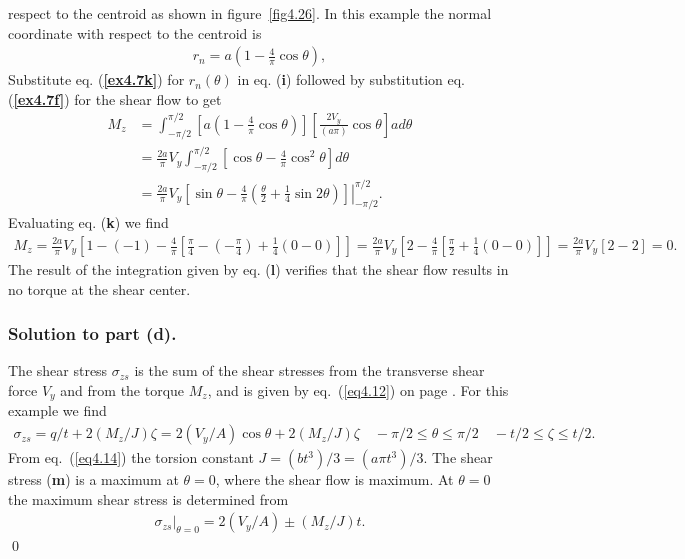 \documentclass{AeroStructure-ERJohnson}
\begin{document}
\begin{example*}
\noindent respect to the centroid as shown in figure~\ref{fig4.26}. In this example the normal coordinate with respect to the centroid is
\begin{align}\label{ex4.7j}
r_{n}=a\left(1-\frac{4}{\pi} \cos \theta\right),\end{align}
Substitute eq. (\textbf{\ref{ex4.7k}}) for $r_{n}(\theta)$ in eq. (\textbf{i}) followed by substitution eq. (\textbf{\ref{ex4.7f}}) for the shear flow to get
\begin{align}\label{ex4.7k}
M_{z}&=\int_{-\pi/2}^{\pi/2}\left[a\left(1-\frac{4}{\pi} \cos \theta\right)\right]\left[\frac{2 V_{y}}{(a \pi)} \cos \theta\right] a d \theta\nonumber\\[5pt]
&=\frac{2 a}{\pi} V_{y} \int_{-\pi/2}^{\pi/2}\left[\cos \theta-\frac{4}{\pi} \cos ^{2} \theta\right] d \theta
\nonumber\\[2pt]
&=\left.\frac{2 a}{\pi} V_{y}\left[\sin \theta-\frac{4}{\pi}\left(\frac{\theta}{2}+\frac{1}{4} \sin 2 \theta\right)\right]\right|_{-\pi/2} ^{\pi/2}.\end{align}
Evaluating eq. (\textbf{k}) we find
\begin{align}\label{ex4.7l}
M_{z} =\frac{2 a}{\pi} V_{y}\left[1-(-1)-\frac{4}{\pi}\left[\frac{\pi}{4}-\left(-\frac{\pi}{4}\right)+\frac{1}{4}(0-0)\right]\right]
=\frac{2 a}{\pi} V_{y}\left[2-\frac{4}{\pi}\left[\frac{\pi}{2}+\frac{1}{4}(0-0)\right]\right]=\frac{2 a}{\pi} V_{y}[2-2]=0.
\end{align}
The result of the integration given by eq. (\textbf{l}) verifies that the shear flow results in no torque at the shear center.

\subsubsection{Solution to part (d).} The shear stress $\sigma_{z s}$ is the sum of the shear stresses from the transverse shear force ${V}_y$ and from the torque $M_{z}$, and is given by eq.~(\ref{eq4.12}) on page \pageref{eq4.12}. For this example we find
\begin{align}\label{ex4.7m}
\sigma_{z s}=q/t+2\left(M_{z}/J\right) \zeta=2\left(V_{y}/A\right) \cos \theta+2\left(M_{z}/J\right) \zeta \quad-\pi/2 \leq \theta \leq \pi/2 \quad-t/2 \leq \zeta \leq t/2.
\end{align}
From eq.~(\ref{eq4.14}) the torsion constant $J=\left(b t^{3}\right)/3=\left(a \pi t^{3}\right)/3$. The shear stress (\textbf{m}) is a maximum at $\theta = 0$, where the shear flow is maximum. At $\theta = 0$ the maximum shear stress is determined\vspace*{-2pt} from
\begin{align}\label{ex4.7n}
\left.\sigma_{z s}\right|_{\theta=0}=2\left(V_{y}/A\right) \pm\left(M_{z}/J\right) t.
\end{align}\hfill\qed
\end{example*}
\end{document}
